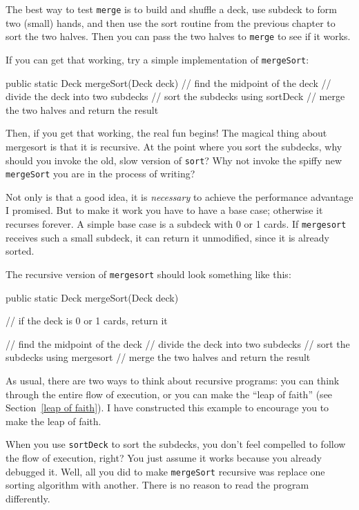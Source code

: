 \documentclass[12pt]{book}
\theoremstyle{exercise}
\newcommand{\java}[1]{\lstinline{#1}} %
\begin{document}
The best way to test \java{merge} is to build and shuffle a deck, use subdeck to form two (small) hands, and then use the sort routine from the previous chapter to sort the two halves.
Then you can pass the two halves to \java{merge} to see if it works.


If you can get that working, try a simple implementation of
\java{mergeSort}:

\begin{code}
public static Deck mergeSort(Deck deck) {
    // find the midpoint of the deck
    // divide the deck into two subdecks
    // sort the subdecks using sortDeck
    // merge the two halves and return the result
}
\end{code}

Then, if you get that working, the real fun begins!  The magical thing about mergesort is that it is recursive.
At the point where you sort the subdecks, why should you invoke the old, slow version of {\tt sort}?
Why not invoke the spiffy new \java{mergeSort} you are in the process of writing?


Not only is that a good idea, it is {\em necessary} to achieve the performance advantage I promised.
But to make it work you have to have a base case; otherwise it recurses forever.
A simple base case is a subdeck with 0 or 1 cards.
If {\tt mergesort} receives such a small subdeck, it can return it unmodified, since it is already sorted.

The recursive version of \java{mergesort} should look something like this:

\begin{code}
public static Deck mergeSort(Deck deck) {
    // if the deck is 0 or 1 cards, return it

    // find the midpoint of the deck
    // divide the deck into two subdecks
    // sort the subdecks using mergesort
    // merge the two halves and return the result
}
\end{code}

As usual, there are two ways to think about recursive programs: you can think through the entire flow of execution, or you can make the ``leap of faith'' (see Section~\ref{leap of faith}).
I have constructed this example to encourage you to make the leap of faith.


When you use \java{sortDeck} to sort the subdecks, you don't feel compelled to follow the flow of execution, right?
You just assume it works because you already debugged it.
Well, all you did to make \java{mergeSort} recursive was replace one sorting algorithm with another.
There is no reason to read the program differently.
\end{document}
